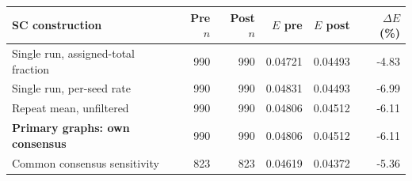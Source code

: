 \begin{tabular}{lrrrrr}
\toprule
SC construction & Pre $n$ & Post $n$ & $E$ pre & $E$ post & $\Delta E$ (\%) \\
\midrule
Single run, assigned-total fraction & 990 & 990 & 0.04721 & 0.04493 & -4.83 \\
Single run, per-seed rate & 990 & 990 & 0.04831 & 0.04493 & -6.99 \\
Repeat mean, unfiltered & 990 & 990 & 0.04806 & 0.04512 & -6.11 \\
\textbf{Primary graphs: own consensus} & 990 & 990 & 0.04806 & 0.04512 & -6.11 \\
Common consensus sensitivity & 823 & 823 & 0.04619 & 0.04372 & -5.36 \\
\bottomrule
\end{tabular}
